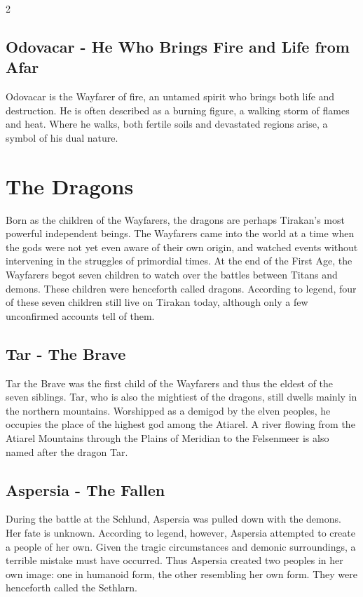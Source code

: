 \begin{multicols}{2}
{\subsection{Odovacar - He Who Brings Fire and Life from Afar}\label{subsec:odovacar-der-feuer-und-leben-aus-der-ferne-bringt}

Odovacar is the Wayfarer of fire, an untamed spirit who brings both life and destruction. He is often described as a burning figure, a walking storm of flames and heat. Where he walks, both fertile soils and devastated regions arise, a symbol of his dual nature.

\section{The Dragons}\label{sec:die-drachen}

Born as the children of the Wayfarers, the dragons are perhaps Tirakan's most powerful independent beings. The Wayfarers came into the world at a time when the gods were not yet even aware of their own origin, and watched events without intervening in the struggles of primordial times. At the end of the First Age, the Wayfarers begot seven children to watch over the battles between Titans and demons. These children were henceforth called dragons. According to legend, four of these seven children still live on Tirakan today, although only a few unconfirmed accounts tell of them.

\subsection{Tar - The Brave}\label{subsec:tar-der-mutige}

Tar the Brave was the first child of the Wayfarers and thus the eldest of the seven siblings. Tar, who is also the mightiest of the dragons, still dwells mainly in the northern mountains. Worshipped as a demigod by the elven peoples, he occupies the place of the highest god among the Atiarel. A river flowing from the Atiarel Mountains through the Plains of Meridian to the Felsenmeer is also named after the dragon Tar.

\subsection{Aspersia - The Fallen}\label{subsec:aspersia-die-gefallene}

During the battle at the Schlund, Aspersia was pulled down with the demons. Her fate is unknown. According to legend, however, Aspersia attempted to create a people of her own. Given the tragic circumstances and demonic surroundings, a terrible mistake must have occurred. Thus Aspersia created two peoples in her own image: one in humanoid form, the other resembling her own form. They were henceforth called the Sethlarn.

}
\end{multicols}

